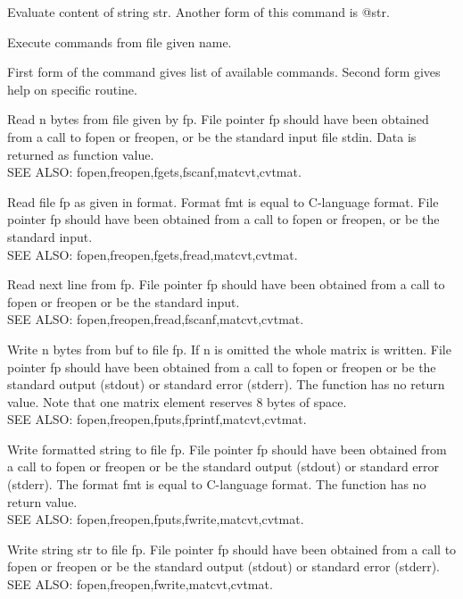 Evaluate content of string str. Another form of this command is @str. 

Execute commands from file given name. 

First form of the command gives list of available commands. Second form gives help on specific routine. 

Read n bytes from file given by fp. File pointer fp should have been obtained from a call to fopen or freopen, or be the standard input file stdin. Data is returned as function value.  \\
SEE ALSO: fopen,freopen,fgets,fscanf,matcvt,cvtmat. 

Read file fp as given in format. Format fmt is equal to C-language format. File pointer fp should have been obtained from a call to fopen or freopen, or be the standard input. \\
SEE ALSO: fopen,freopen,fgets,fread,matcvt,cvtmat. 

Read next line from fp. File pointer fp should have been obtained from a call to fopen or freopen or be the standard input. \\ 
SEE ALSO: fopen,freopen,fread,fscanf,matcvt,cvtmat. 

Write n bytes from buf to file fp. If n is omitted the whole matrix is written. File pointer fp should have been obtained from a call to fopen or freopen or be the standard output (stdout) or standard error (stderr). The function has no return value. 
Note that one matrix element reserves 8 bytes of space. \\
SEE ALSO: fopen,freopen,fputs,fprintf,matcvt,cvtmat. 

Write formatted string to file fp. File pointer fp should have been obtained from a call to fopen or freopen or be the standard output (stdout) or standard error (stderr). The format fmt is equal to C-language format. The function has no return value. \\
SEE ALSO: fopen,freopen,fputs,fwrite,matcvt,cvtmat. 

Write string str to file fp. File pointer fp should have been obtained from a call to fopen or freopen or be the standard output (stdout) or standard error (stderr). \\SEE ALSO: fopen,freopen,fwrite,matcvt,cvtmat. 

